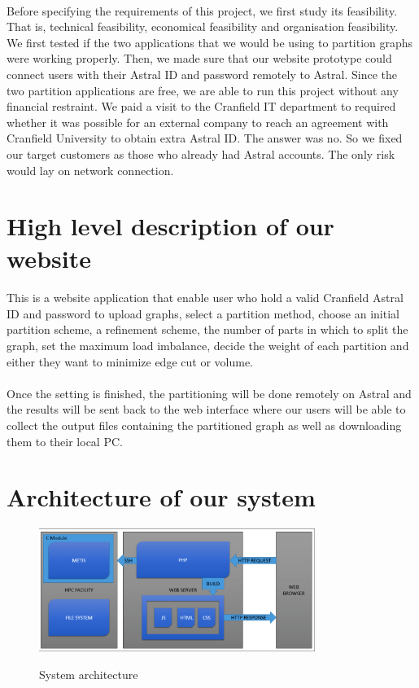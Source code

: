 \documentclass{cranfieldChart}
\begin{document}
\paragraph{}
Before specifying the requirements of this project, we first study its feasibility. That is, technical feasibility, economical feasibility and organisation feasibility. We first tested if the two applications that we would be using to partition graphs were working properly. Then, we made sure that our website prototype could connect users with their Astral ID and password remotely to Astral. Since the two partition applications are free, we are able to run this project without any financial restraint. We paid a visit to the Cranfield IT department to required whether it was possible for an external company to reach an agreement with Cranfield University to obtain extra Astral ID. The answer was no. So we fixed our target customers as those who already had Astral accounts. The only risk would lay on network connection. 

\section{High level description of our website}
\paragraph{}
This is a website application that enable user who hold a valid Cranfield Astral ID and password to upload graphs, select a partition method, choose an initial partition scheme, a refinement scheme, the number of parts in which to split the graph, set the maximum load imbalance, decide the weight of each partition and either they want to minimize edge cut or volume. 
\paragraph{}
Once the setting is finished, the partitioning will be done remotely on Astral and the results will be sent back to the web interface where our users will be able to collect the output files containing the partitioned graph as well as downloading them to their local PC. 

\section{Architecture of our system}

\begin{figure}[h]
\centering
\includegraphics[width=0.8\textwidth]{ressources/architect}
\label{architect}
\caption{System architecture}
\end{figure}
\end{document}
